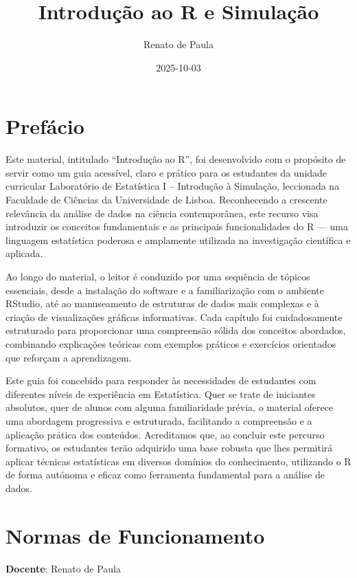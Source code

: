\documentclass[
]{book}
\title{Introdução ao R e Simulação}
\author{Renato de Paula}
\date{2025-10-03}
\begin{document}
\maketitle

{
\setcounter{tocdepth}{1}
\tableofcontents
}
\chapter{Prefácio}\label{prefuxe1cio}

Este material, intitulado ``Introdução ao R'', foi desenvolvido com o propósito de servir como um guia acessível, claro e prático para os estudantes da unidade curricular Laboratório de Estatística I -- Introdução à Simulação, leccionada na Faculdade de Ciências da Universidade de Lisboa. Reconhecendo a crescente relevância da análise de dados na ciência contemporânea, este recurso visa introduzir os conceitos fundamentais e as principais funcionalidades do R --- uma linguagem estatística poderosa e amplamente utilizada na investigação científica e aplicada.

Ao longo do material, o leitor é conduzido por uma sequência de tópicos essenciais, desde a instalação do software e a familiarização com o ambiente RStudio, até ao manuseamento de estruturas de dados mais complexas e à criação de visualizações gráficas informativas. Cada capítulo foi cuidadosamente estruturado para proporcionar uma compreensão sólida dos conceitos abordados, combinando explicações teóricas com exemplos práticos e exercícios orientados que reforçam a aprendizagem.

Este guia foi concebido para responder às necessidades de estudantes com diferentes níveis de experiência em Estatística. Quer se trate de iniciantes absolutos, quer de alunos com alguma familiaridade prévia, o material oferece uma abordagem progressiva e estruturada, facilitando a compreensão e a aplicação prática dos conteúdos. Acreditamos que, ao concluir este percurso formativo, os estudantes terão adquirido uma base robusta que lhes permitirá aplicar técnicas estatísticas em diversos domínios do conhecimento, utilizando o R de forma autónoma e eficaz como ferramenta fundamental para a análise de dados.

\chapter{Normas de Funcionamento}\label{normas-de-funcionamento}

\textbf{Docente}: Renato de Paula
\end{document}
